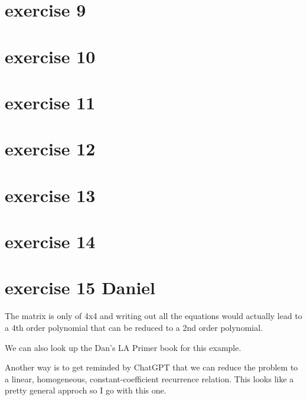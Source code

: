 \documentclass{article}
\begin{document}
\section{exercise 9}
\section{exercise 10}
\section{exercise 11}
\section{exercise 12}
\section{exercise 13}
\section{exercise 14}
\section{exercise 15 Daniel}
The matrix is only of 4x4 and writing out all the equations would actually lead to a 4th order polynomial that can be reduced to a 2nd order polynomial.

We can also look up the Dan's LA Primer book for this example.

Another way is to get reminded by ChatGPT that we can reduce the problem to a linear, homogeneous, constant-coefficient recurrence relation. This looks like a pretty general approch so I go with this one.
\end{document}
